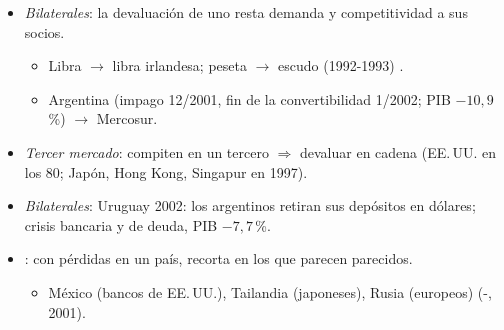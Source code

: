 \documentclass{article}
\begin{document}
\begin{columnas}
\begin{itemize}
\item \emph{Bilaterales}: la devaluación de uno resta demanda y competitividad a sus socios.
  \begin{itemize}
  \item Libra $\to$ libra irlandesa; peseta $\to$ escudo (1992-1993) .
  \item Argentina (impago 12/2001, fin de la convertibilidad 1/2002; PIB $-10{,}9$\,\%) $\to$ Mercosur.
  \end{itemize}
\item \emph{Tercer mercado}: compiten en un tercero $\Rightarrow$ devaluar en cadena (EE.\,UU. en los 80; Japón, Hong Kong, Singapur en 1997).
\end{itemize}
\begin{itemize}
\item \emph{Bilaterales}: Uruguay 2002: los argentinos retiran sus depósitos en dólares; crisis bancaria y de deuda, PIB $-7{,}7$\,\%.
\item {}: con pérdidas en un país, recorta en los que parecen parecidos.
  \begin{itemize}
  \item México (bancos de EE.\,UU.), Tailandia (japoneses), Rusia (europeos) (-, 2001).
  \end{itemize}
\end{itemize}


\end{columnas}
\end{document}
